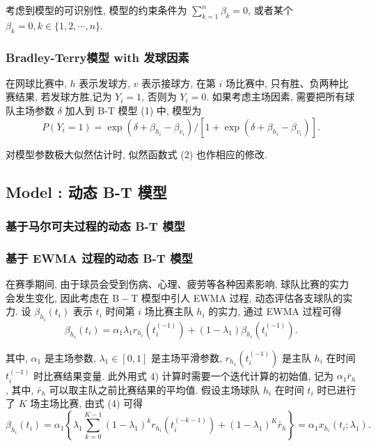\documentclass{mcmthesis}
\begin{document}
考虑到模型的可识别性, 模型的约束条件为 $\sum_{k=1}^n \beta_k=0$, 或者某个 $\beta_k=0, k \in\{1,2, \cdots, n\}$.


\subsubsection{Bradley-Terry模型 with 发球因素}

在网球比赛中, $h$ 表示发球方, $v$ 表示接球方, 在第 $i$ 场比赛中, 只有胜、负两种比赛结果, 若发球方胜,记为 $Y_i=1$, 否则为 $Y_i=0$. 如果考虑主场因素, 需要把所有球队主场参数 $\delta$ 加人到 B-T 模型 (1) 中, 模型为
\begin{equation*}
P\left(Y_i=1\right)=\exp \left(\delta+\beta_{h_i}-\beta_{v_i}\right) /\left[1+\exp \left(\delta+\beta_{h_i}-\beta_{v_i}\right)\right] .
\end{equation*}

对模型参数极大似然估计时, 似然函数式 (2) 也作相应的修改.




\subsection{Model \uppercase\expandafter{}: 动态 B-T 模型}

\subsubsection{ 基于马尔可夫过程的动态 B-T 模型}




\subsubsection{ 基于 EWMA 过程的动态 B-T 模型}

在赛季期间, 由于球员会受到伤病、心理、疲劳等各种因素影响, 球队比赛的实力会发生变化, 因此考虑在 $\mathrm{B}-\mathrm{T}$ 模型中引人 EWMA 过程, 动态评估各支球队的实力.
设 $\beta_{h_i}\left(t_i\right)$ 表示 $t_i$ 时间第 $i$ 场比赛主队 $h_i$ 的实力, 通过 EWMA 过程可得
\begin{equation*}
\beta_{h_i}\left(t_i\right)=\alpha_1 \lambda_1 r_{h_i}\left(t_i^{(-1)}\right)+\left(1-\lambda_1\right) \beta_{h_i}\left(t_i^{(-1)}\right) .
\end{equation*}

其中, $\alpha_1$ 是主场参数, $\lambda_1 \in[0,1]$ 是主场平滑参数, $r_{h_1}\left(t_i^{(-1)}\right)$ 是主队 $h_i$ 在时间 $t_i^{(-1)}$ 时比赛结果变量.
此外用式 4) 计算时需要一个迭代计算的初始值, 记为 $\alpha_1 \bar{r}_h$, 其中, $\bar{r}_h$ 可以取主队之前比赛结果的平均值. 假设主场球队 $h_i$ 在时间 $t_i$ 时已进行了 $K$ 场主场比赛, 由式 (4) 可得
\begin{equation*}
\beta_{h_i}\left(t_i\right)=\alpha_1\left\{\lambda_1 \sum_{k=0}^{K-1}\left(1-\lambda_1\right)^k r_{h_i}\left(t_i^{(-k-1)}\right)+\left(1-\lambda_1\right)^K \bar{r}_h\right\}=\alpha_1 x_{h_i}\left(t_i ; \lambda_1\right) .
\end{equation*}
\end{document}

